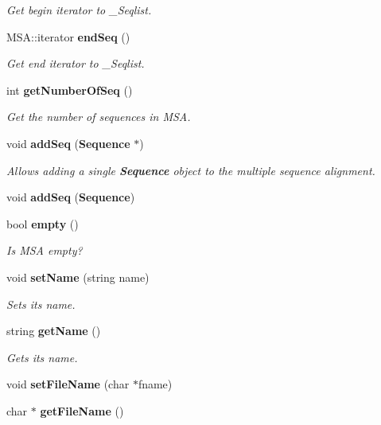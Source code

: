 \begin{CompactItemize}
\begin{CompactList}\small\item\em Get begin iterator to \_\-Seqlist. \item\end{CompactList}\item 
MSA::iterator {\bf end\-Seq} ()\label{classMultipleSeqAlign_a12}

\begin{CompactList}\small\item\em Get end iterator to \_\-Seqlist. \item\end{CompactList}\item 
int {\bf get\-Number\-Of\-Seq} ()\label{classMultipleSeqAlign_a13}

\begin{CompactList}\small\item\em Get the number of sequences in MSA. \item\end{CompactList}\item 
void {\bf add\-Seq} ({\bf Sequence} $\ast$)\label{classMultipleSeqAlign_a14}

\begin{CompactList}\small\item\em Allows adding a single {\bf Sequence} object to the multiple sequence alignment. \item\end{CompactList}\item 
void {\bf add\-Seq} ({\bf Sequence})\label{classMultipleSeqAlign_a15}

\item 
bool {\bf empty} ()\label{classMultipleSeqAlign_a16}

\begin{CompactList}\small\item\em Is MSA empty? \item\end{CompactList}\item 
void {\bf set\-Name} (string name)\label{classMultipleSeqAlign_a17}

\begin{CompactList}\small\item\em Sets its name. \item\end{CompactList}\item 
string {\bf get\-Name} ()\label{classMultipleSeqAlign_a18}

\begin{CompactList}\small\item\em Gets its name. \item\end{CompactList}\item 
void {\bf set\-File\-Name} (char $\ast$fname)
\item 
char $\ast$ {\bf get\-File\-Name} ()\label{classMultipleSeqAlign_a20}


\end{CompactItemize}
